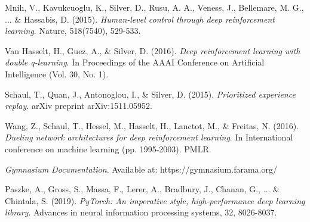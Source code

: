 \documentclass[11pt,a4paper]{article}
\begin{document}
\begin{thebibliography}{9}

Mnih, V., Kavukcuoglu, K., Silver, D., Rusu, A. A., Veness, J., Bellemare, M. G., ... \& Hassabis, D. (2015).
\textit{Human-level control through deep reinforcement learning}.
Nature, 518(7540), 529-533.

Van Hasselt, H., Guez, A., \& Silver, D. (2016).
\textit{Deep reinforcement learning with double q-learning}.
In Proceedings of the AAAI Conference on Artificial Intelligence (Vol. 30, No. 1).

Schaul, T., Quan, J., Antonoglou, I., \& Silver, D. (2015).
\textit{Prioritized experience replay}.
arXiv preprint arXiv:1511.05952.

Wang, Z., Schaul, T., Hessel, M., Hasselt, H., Lanctot, M., \& Freitas, N. (2016).
\textit{Dueling network architectures for deep reinforcement learning}.
In International conference on machine learning (pp. 1995-2003). PMLR.

\textit{Gymnasium Documentation}.
Available at: https://gymnasium.farama.org/

Paszke, A., Gross, S., Massa, F., Lerer, A., Bradbury, J., Chanan, G., ... \& Chintala, S. (2019).
\textit{PyTorch: An imperative style, high-performance deep learning library}.
Advances in neural information processing systems, 32, 8026-8037.

\end{thebibliography}
\end{document}
